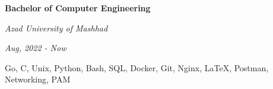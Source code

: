 \documentclass{engineercv}
\begin{document}
\begin{minipage}{\textwidth}
  \begin{multicols}{2}
    \begin{minipage}{0.5\textwidth}
      \textbf{Bachelor of Computer Engineering}

      \textit{Azad University of Mashhad}

      \textit{Aug, 2022 - Now}
    \end{minipage}
    \columnbreak
    \begin{minipage}{0.5\textwidth}
      Go, C, Unix, Python, Bash, SQL, Docker, Git,
      Nginx, \LaTeX, Postman, Networking, PAM
    \end{minipage}
  \end{multicols}
\end{minipage}
\end{document}
